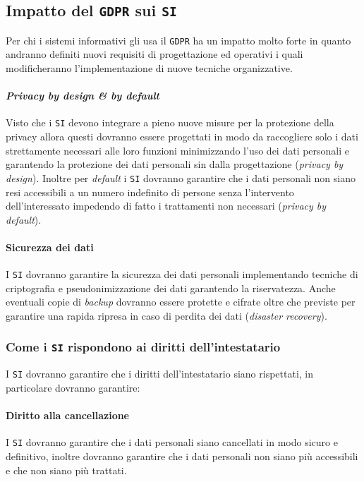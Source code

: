 {    \subsection{Impatto del \texttt{GDPR} sui \texttt{SI}}
        Per chi i sistemi informativi gli usa il \texttt{GDPR} ha un impatto molto forte in quanto andranno definiti nuovi requisiti di progettazione ed operativi i quali modificheranno l'implementazione di nuove tecniche organizzative.
        \paragraph{\textit{Privacy by design \& by default}} Visto che i \texttt{SI} devono integrare a pieno nuove misure per la protezione della privacy allora questi dovranno essere progettati in modo da raccogliere solo i dati strettamente necessari alle loro funzioni minimizzando l'uso dei dati personali e garantendo la protezione dei dati personali sin dalla progettazione (\textit{privacy by design}). Inoltre per \textit{default} i \texttt{SI} dovranno garantire che i dati personali non siano resi accessibili a un numero indefinito di persone senza l'intervento dell'interessato impedendo di fatto i trattamenti non necessari (\textit{privacy by default}).
        \paragraph{Sicurezza dei dati} I \texttt{SI} dovranno garantire la sicurezza dei dati personali implementando tecniche di criptografia e pseudonimizzazione dei dati garantendo la riservatezza. Anche eventuali copie di \textit{backup} dovranno essere protette e cifrate oltre che previste per garantire una rapida ripresa in caso di perdita dei dati (\textit{disaster recovery}).
        \subsubsection{Come i \texttt{SI} rispondono ai diritti dell'intestatario}
            I \texttt{SI} dovranno garantire che i diritti dell'intestatario siano rispettati, in particolare dovranno garantire:
            \paragraph{Diritto alla cancellazione} I \texttt{SI} dovranno garantire che i dati personali siano cancellati in modo sicuro e definitivo, inoltre dovranno garantire che i dati personali non siano più accessibili e che non siano più trattati.
}
